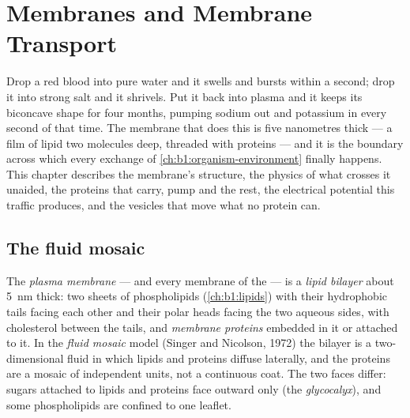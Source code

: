 \chapter{Membranes and Membrane Transport}\label{ch:b1:membranes-transport}

Drop a red blood  into pure water and it swells and bursts within a
second; drop it into strong salt and it shrivels. Put it back into
plasma and it keeps its biconcave shape for four months, pumping sodium
out and potassium in every second of that time. The membrane that does
this is five nanometres thick --- a film of lipid two molecules deep,
threaded with proteins --- and it is the boundary across which every
exchange of \cref{ch:b1:organism-environment} finally happens. This
chapter describes the membrane's structure, the physics of what crosses
it unaided, the proteins that carry, pump and  the rest, the
electrical potential this traffic produces, and the vesicles that move
what no protein can.

\section{The fluid mosaic}

\begin{definition}\label{def:b1:membranes-transport:membrane}
The \emph{plasma membrane} --- and every
membrane of the  --- is a \emph{lipid bilayer}
about \qty{5}{nm} thick: two sheets of phospholipids
(\cref{ch:b1:lipids}) with their hydrophobic tails facing each other
and their polar heads facing the two aqueous sides, with cholesterol
between the tails, and \emph{membrane proteins}
embedded in it or attached to it. In the \emph{fluid mosaic} model (Singer and Nicolson, 1972) the bilayer is a
two-dimensional fluid in which lipids and proteins diffuse laterally,
and the proteins are a mosaic of independent units, not a continuous
coat. The two faces differ: sugars attached to lipids and proteins face
outward only (the \emph{glycocalyx}), and some phospholipids are
confined to one leaflet.
\end{definition}

